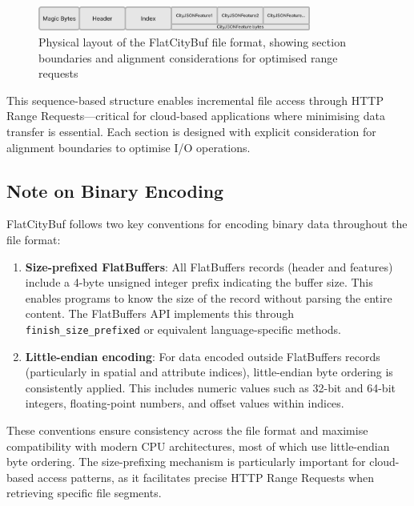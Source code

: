 \begin{figure}[h]
  \centering
  \includegraphics[width=0.8\textwidth]{figs/methodology/file_structure.png}
  \caption{Physical layout of the FlatCityBuf file format, showing section boundaries and alignment considerations for optimised range requests}
  \label{fig:methodology:file-structure}
\end{figure}

This sequence-based structure enables incremental file access through HTTP Range Requests—critical for cloud-based applications where minimising data transfer is essential. Each section is designed with explicit consideration for alignment boundaries to optimise I/O operations.

\subsection{Note on Binary Encoding}
\label{methodology:overview:note_on_binary_encoding}
FlatCityBuf follows two key conventions for encoding binary data throughout the file format:

\begin{enumerate}
    \item \textbf{Size-prefixed FlatBuffers}: All FlatBuffers records (header and features) include a 4-byte unsigned integer prefix indicating the buffer size. This enables programs to know the size of the record without parsing the entire content. The FlatBuffers API implements this through \texttt{finish\_size\_prefixed} or equivalent language-specific methods.

    \item \textbf{Little-endian encoding}: For data encoded outside FlatBuffers records (particularly in spatial and attribute indices), little-endian byte ordering is consistently applied. This includes numeric values such as 32-bit and 64-bit integers, floating-point numbers, and offset values within indices.
\end{enumerate}

These conventions ensure consistency across the file format and maximise compatibility with modern CPU architectures, most of which use little-endian byte ordering. The size-prefixing mechanism is particularly important for cloud-based access patterns, as it facilitates precise HTTP Range Requests when retrieving specific file segments.

